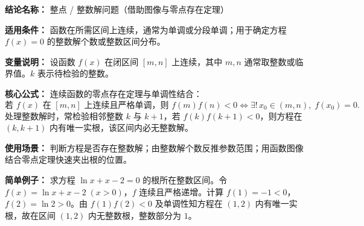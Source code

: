 \textbf{结论名称：} 整点 / 整数解问题（借助图像与零点存在定理）

\textbf{适用条件：} 函数在所需区间上连续，通常为单调或分段单调；用于确定方程 \(f(x)=0\) 的整数解个数或整数区间分布。

\textbf{变量说明：} 设函数 \(f(x)\) 在闭区间 \([m,n]\) 上连续，其中 \(m,n\) 通常取整数或临界值。\(k\) 表示待检验的整数。

\textbf{核心公式：} 连续函数的零点存在定理与单调性结合：
\[
\boxed{\text{若 } f(x) \text{ 在 } [m,n] \text{ 上连续且严格单调，则 } f(m)f(n)<0 \iff \exists!\, x_{0}\in(m,n),\; f(x_{0})=0.}
\]
处理整数解时，常检验相邻整数 \(k\) 与 \(k+1\)，若 \(f(k)f(k+1)<0\)，则方程在 \((k,k+1)\) 内有唯一实根，该区间内必无整数解。

\textbf{使用场景：} 判断方程是否存在整数解；由整数解个数反推参数范围；用函数图像结合零点定理快速夹出根的位置。

\textbf{简单例子：} 求方程 \(\ln x + x - 2 = 0\) 的根所在整数区间。令 \(f(x)=\ln x + x - 2\;(x>0)\)，\(f\) 连续且严格递增。计算 \(f(1)= -1<0\)，\(f(2)=\ln 2 >0\)。由 \(f(1)f(2)<0\) 及单调性知方程在 \((1,2)\) 内有唯一实根，故在区间 \((1,2)\) 内无整数根，整数部分为 \(1\)。
